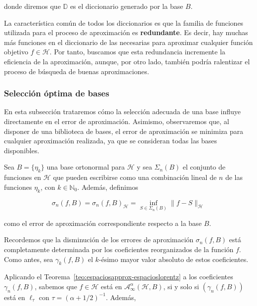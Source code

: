 donde diremos que $\mathbb{D}$ es el diccionario generado por la base $B$.\newline

La característica común de todos los diccionarios es que la familia de funciones utilizada para el proceso de aproximación es \textbf{redundante}. Es decir, hay muchas más funciones en el diccionario de las necesarias para aproximar cualquier función objetivo $f \in \mathcal{H}$. Por tanto, buscamos que esta redundancia incremente la eficiencia de la aproximación, aunque, por otro lado, también podría ralentizar el proceso de búsqueda de buenas aproximaciones.\newline

\subsubsection{Selección óptima de bases}\label{subsubsec:seleccion-optima-bases}

En esta subsección trataremos cómo la selección adecuada de una base influye directamente en el error de aproximación. Asimismo, observaremos que, al disponer de una biblioteca de bases, el error de aproximación se minimiza para cualquier aproximación realizada, ya que se consideran todas las bases disponibles.\newline

Sea $B = \{ \eta_k \}$ una base ortonormal para $\mathcal{H}$ y sea $\Sigma_n(B)$ el conjunto de funciones en $\mathcal{H}$ que pueden escribirse como una combinación lineal de $n$ de las funciones $\eta_k$, con $k \in \mathbb{N}_0$. Además, definimos

\[
    \sigma_n(f, B) = \sigma_n(f,B)_{\mathcal{H}} = \inf_{S \in \Sigma_n(B)} \| f - S \|_{\mathcal{H}}
\]

como el error de aproximación correspondiente respecto a la base $B$.\newline

Recordemos que la disminución de los errores de aproximación $\sigma_n(f, B)$ está completamente determinada por los coeficientes reorganizados de la función $f$. Como antes, sea $\gamma_k(f, B)$ el $k$-ésimo mayor valor absoluto de estos coeficientes.\newline

Aplicando el Teorema~\ref{teo:espaciosapprox-espacioslorentz} a los coeficientes $\gamma_n(f, B)$, sabemos que $f \in \mathcal{H}$ está en $\mathcal{A}_\infty^\alpha (\mathcal{H}, B)$, si y solo si $(\gamma_n(f, B))$ está en $\ell_{\tau}$ con $\tau = (\alpha + 1/2)^{-1}$. Además, 

